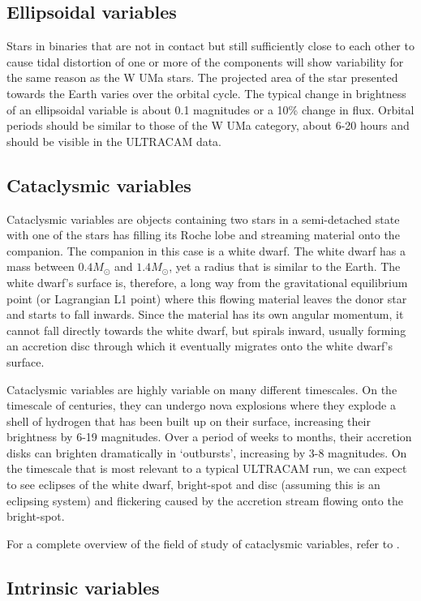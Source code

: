 \subsection{Ellipsoidal variables}
Stars in binaries that are not in contact but still sufficiently close to each other to cause tidal distortion of one or more of the components will show variability for the same reason as the {W UMa} stars. The projected area of the star presented towards the Earth varies over the orbital cycle. The typical change in brightness of an ellipsoidal variable is about 0.1 magnitudes or a 10\% change in flux. Orbital periods should be similar to those of the {W UMa} category, about 6-20 hours and should be visible in the ULTRACAM data. 

\subsection{Cataclysmic variables}
Cataclysmic variables are objects containing two stars in a semi-detached state with one of the stars has filling its Roche lobe and streaming material onto the companion. The companion in this case is a white dwarf. The white dwarf has a mass between $0.4 M_{\odot}$ and $1.4 M_{\odot}$, yet a radius that is similar to the Earth. The white dwarf's surface is, therefore, a long way from the gravitational equilibrium point (or Lagrangian L1 point) where this flowing material leaves the donor star and starts to fall inwards. Since the material has its own angular momentum, it cannot fall directly towards the white dwarf, but spirals inward, usually forming an accretion disc through which it eventually migrates onto the white dwarf's surface. 

Cataclysmic variables are highly variable on many different timescales. On the timescale of centuries, they can undergo nova explosions where they explode a shell of hydrogen that has been built up on their surface, increasing their brightness by 6-19 magnitudes. Over a period of weeks to months, their accretion disks can brighten dramatically in `outbursts', increasing by 3-8 magnitudes. On the timescale that is most relevant to a typical ULTRACAM run, we can expect to see eclipses of the white dwarf, bright-spot and disc (assuming this is an eclipsing system) and flickering caused by the accretion stream flowing onto the bright-spot. 

For a complete overview of the field of study of cataclysmic variables, refer to \citet{WarnerBook}. 

\subsection{Intrinsic variables}

